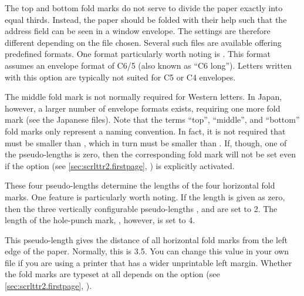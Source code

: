 The top and bottom fold marks do not serve to divide the
paper exactly into equal thirds. Instead, the paper should be folded with
their help such that the address field can be seen in a window envelope. The
settings are therefore different depending on the  file chosen.
Several such files are available offering predefined formats. One format
particularly worth noting is . This format assumes an
envelope format of C6/5 (also known as ``C6 long''). Letters written with this
option are typically not suited for C5 or C4 envelopes.

The middle fold mark is not normally required for Western letters. In Japan,
however, a larger number of envelope formats exists, requiring one more fold
mark (see the Japanese  files). Note that the terms ``top'',
``middle'', and ``bottom'' fold marks only represent a naming convention. In
fact, it is not required that  must be smaller than
, which in turn must be smaller than
. If, though, one of the pseudo-lengths is zero, then
the corresponding fold mark will not be set even if the
%
 option (see
\autoref{sec:scrlttr2.firstpage}, ) is
explicitly activated.
%
\EndIndexGroup


\begin{Declaration}
\end{Declaration}
These four pseudo-lengths determine the
lengths of the four horizontal fold marks. One feature is
particularly worth noting. If the length is given as zero, then the three
vertically configurable pseudo-lengths ,
 and  are set to 2.
The length of the hole-punch mark, , however, is set
to 4.%
\EndIndexGroup


\begin{Declaration}
\end{Declaration}
This pseudo-length gives the distance of all horizontal fold marks from the
left edge of the paper. Normally, this is 3.5. You
can change this value in your own  file if you are using a printer
that has a wider unprintable left margin. Whether the fold marks are typeset
at all depends on the option %
%
 (see
\autoref{sec:scrlttr2.firstpage}, ).
%
\EndIndexGroup


